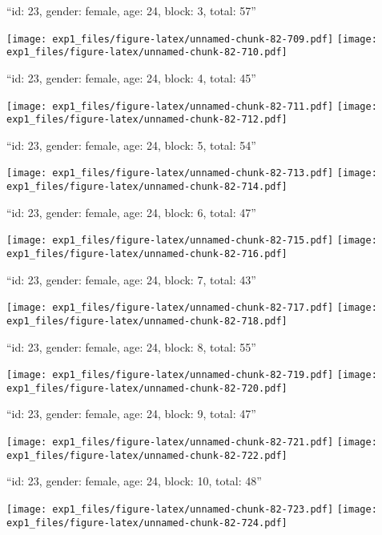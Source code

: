 \documentclass[11pt,,]{article}
\begin{document}
\newpage
[1] 

``id: 23, gender: female, age: 24, block: 3, total: 57''

\texttt{[image: exp1\_files/figure-latex/unnamed-chunk-82-709.pdf]}
\texttt{[image: exp1\_files/figure-latex/unnamed-chunk-82-710.pdf]}

\newpage
[1] 

``id: 23, gender: female, age: 24, block: 4, total: 45''

\texttt{[image: exp1\_files/figure-latex/unnamed-chunk-82-711.pdf]}
\texttt{[image: exp1\_files/figure-latex/unnamed-chunk-82-712.pdf]}

\newpage
[1] 

``id: 23, gender: female, age: 24, block: 5, total: 54''

\texttt{[image: exp1\_files/figure-latex/unnamed-chunk-82-713.pdf]}
\texttt{[image: exp1\_files/figure-latex/unnamed-chunk-82-714.pdf]}

\newpage
[1] 

``id: 23, gender: female, age: 24, block: 6, total: 47''

\texttt{[image: exp1\_files/figure-latex/unnamed-chunk-82-715.pdf]}
\texttt{[image: exp1\_files/figure-latex/unnamed-chunk-82-716.pdf]}

\newpage
[1] 

``id: 23, gender: female, age: 24, block: 7, total: 43''

\texttt{[image: exp1\_files/figure-latex/unnamed-chunk-82-717.pdf]}
\texttt{[image: exp1\_files/figure-latex/unnamed-chunk-82-718.pdf]}

\newpage
[1] 

``id: 23, gender: female, age: 24, block: 8, total: 55''

\texttt{[image: exp1\_files/figure-latex/unnamed-chunk-82-719.pdf]}
\texttt{[image: exp1\_files/figure-latex/unnamed-chunk-82-720.pdf]}

\newpage
[1] 

``id: 23, gender: female, age: 24, block: 9, total: 47''

\texttt{[image: exp1\_files/figure-latex/unnamed-chunk-82-721.pdf]}
\texttt{[image: exp1\_files/figure-latex/unnamed-chunk-82-722.pdf]}

\newpage
[1] 

``id: 23, gender: female, age: 24, block: 10, total: 48''

\texttt{[image: exp1\_files/figure-latex/unnamed-chunk-82-723.pdf]}
\texttt{[image: exp1\_files/figure-latex/unnamed-chunk-82-724.pdf]}
\end{document}
